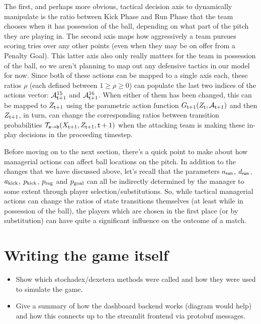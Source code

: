 The first, and perhaps more obvious, tactical decision axis to dynamically manipulate is the ratio between {\sf Kick Phase} and {\sf Run Phase} that the team chooses when it has possession of the ball, depending on what part of the pitch they are playing in. The second axis maps how aggressively a team pursues scoring tries over any other points (even when they may be on offer from a {\sf Penalty Goal}). This latter axis also only really matters for the team in possession of the ball, so we aren't planning to map out any defensive tactics in our model for now. Since both of these actions can be mapped to a single axis each, these ratios $\rho$ (each defined between $1\geq \rho \geq 0$) can populate the last two indices of the actions vector: ${\cal A}^{15}_{{\sf t}+1}$ and ${\cal A}^{16}_{{\sf t}+1}$. When either of them has been changed, this can be mapped to $Z_{{\sf t}+1}$ using the parametric action function $G_{{\sf t}+1}(Z_{\sf t},{\cal A}_{{\sf t}+1})$ and then $Z_{{\sf t}+1}$, in turn, can change the corresponding ratios between transition probabilities ${\cal T}_{{\sf a}\rightarrow {\sf b}}(X_{{\sf t}+1},Z_{{\sf t}+1},{\sf t}+1)$ when the attacking team is making these in-play decisions in the proceeding timestep.

Before moving on to the next section, there's a quick point to make about how managerial actions can affect ball locations on the pitch. In addition to the changes that we have discussed above, let's recall that the parameters $a_{\sf run}$, $d_{\sf run}$, $a_{\rm kick}$, $p_{\rm kick}$, $p_{\rm reg}$ and $p_{\rm goal}$ can all be indirectly determined by the manager to some extent through player selection/substitutions. So, while tactical managerial actions can change the ratios of state transitions themselves (at least while in possession of the ball), the players which are chosen in the first place (or by substitution) can have quite a significant influence on the outcome of a match.

\section{\sffamily Writing the game itself}

\begin{itemize}
\item{Show which stochadex/dexetera methods were called and how they were used to simulate the game.}
\item{Give a summary of how the dashboard backend works (diagram would help) and how this connects up to the streamlit frontend via protobuf messages.}
\end{itemize}
